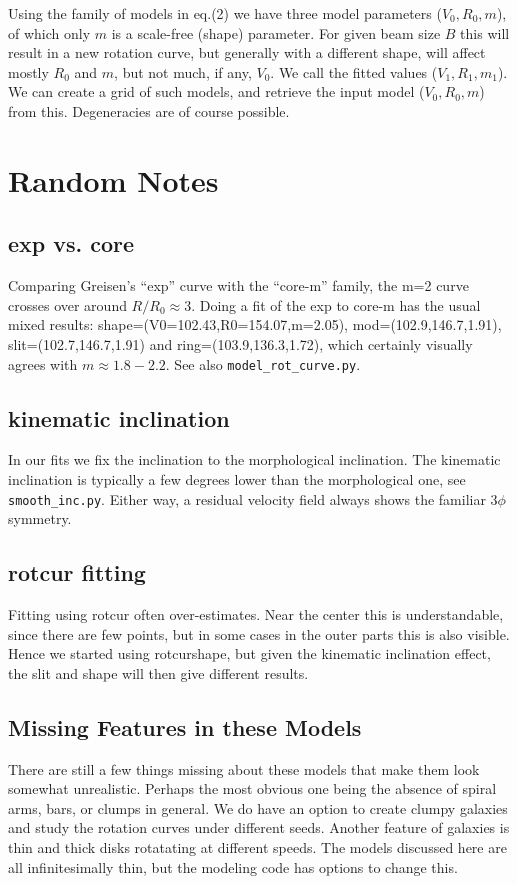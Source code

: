 \documentclass[12pt]{article}
\begin{document}
Using the family of models in eq.(2) we have three model parameters
($V_0,R_0,m$), of which only $m$ is a scale-free (shape) parameter.
For given beam size $B$ this will result in a new
rotation curve, but generally with a different shape,
will affect mostly $R_0$
and $m$, but not much, if any, $V_0$.   We call the fitted
values ($V_1,R_1,m_1$). We can create a grid of such models,
and retrieve the input model
($V_0,R_0,m$) from this. Degeneracies are of course possible.

\section{Random Notes}

\subsection{exp vs. core}

Comparing Greisen's ``exp'' curve with the ``core-m'' family, the m=2 curve crosses over around $R/R_0 \approx 3$. Doing a fit
of the exp to core-m has the usual mixed results:   shape=(V0=102.43,R0=154.07,m=2.05),
mod=(102.9,146.7,1.91), slit=(102.7,146.7,1.91) and ring=(103.9,136.3,1.72), which certainly visually agrees with $m \approx 1.8-2.2$.
See also {\tt model\_rot\_curve.py}.

\subsection{kinematic inclination}

In our fits we fix the inclination to the morphological inclination. The kinematic inclination is typically a few degrees lower
than the morphological one, see {\tt smooth\_inc.py}. Either way, a residual velocity field always shows the familiar $3\phi$ symmetry.

\subsection{rotcur fitting}

Fitting using rotcur often over-estimates. Near the center this is understandable, since there are few points, but in some cases
in the outer parts this is also visible. Hence we started using rotcurshape, but given the kinematic inclination effect, the slit
and shape will then give different results.

\subsection{Missing Features in these Models}

There are still a few things missing about these models that make them look somewhat unrealistic.  Perhaps the most obvious one being
the absence of spiral arms, bars, or clumps in general. We do have an option to create clumpy galaxies and study the rotation curves
under different seeds.
Another feature of galaxies is thin and thick disks rotatating at
different speeds. The models discussed here are all infinitesimally thin, but the modeling code has options to change this.
\end{document}
